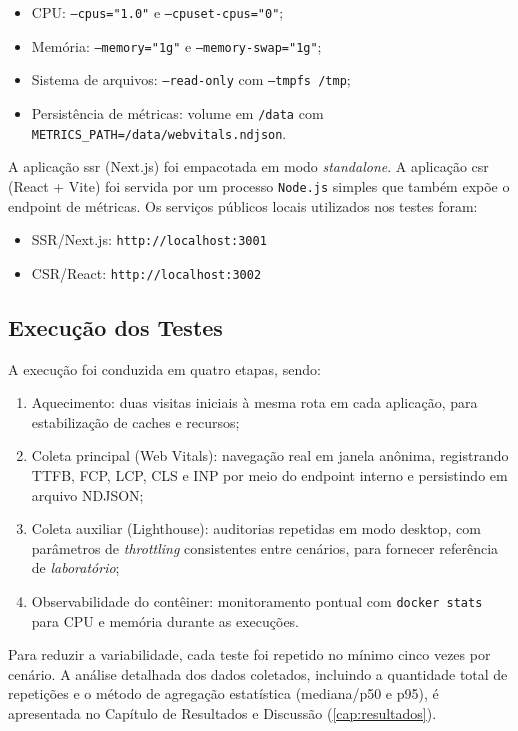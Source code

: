 \begin{itemize}
    \item CPU: \texttt{--cpus="1.0"} e \texttt{--cpuset-cpus="0"};
    \item Memória: \texttt{--memory="1g"} e \texttt{--memory-swap="1g"};
    \item Sistema de arquivos: \texttt{--read-only} com \texttt{--tmpfs /tmp};
    \item Persistência de métricas: volume em \texttt{/data} com \texttt{METRICS\_PATH=/data/webvitals.ndjson}.
\end{itemize}

A aplicação \acrshort{ssr} (Next.js) foi empacotada em modo \textit{standalone}. A aplicação \acrshort{csr} (React + Vite) foi servida por um processo \texttt{Node.js} simples que também expõe o endpoint de métricas. Os serviços públicos locais utilizados nos testes foram:
\begin{itemize}
    \item SSR/Next.js: \texttt{http://localhost:3001}
    \item CSR/React: \texttt{http://localhost:3002}
\end{itemize}

\subsection{Execução dos Testes}

A execução foi conduzida em quatro etapas, sendo:

\begin{enumerate}
    \item Aquecimento: duas visitas iniciais à mesma rota em cada aplicação, para estabilização de caches e recursos;
    \item Coleta principal (Web Vitals): navegação real em janela anônima, registrando TTFB, FCP, LCP, CLS e INP por meio do endpoint interno e persistindo em arquivo NDJSON;
    \item Coleta auxiliar (Lighthouse): auditorias repetidas em modo desktop, com parâmetros de \textit{throttling} consistentes entre cenários, para fornecer referência de \textit{laboratório};
    \item Observabilidade do contêiner: monitoramento pontual com \texttt{docker stats} para CPU e memória durante as execuções.
\end{enumerate}


Para reduzir a variabilidade, cada teste foi repetido no mínimo cinco vezes por cenário. A análise detalhada dos dados coletados, incluindo a quantidade total de repetições e o método de agregação estatística (mediana/p50 e p95), é apresentada no Capítulo de Resultados e Discussão (\autoref{cap:resultados}).

